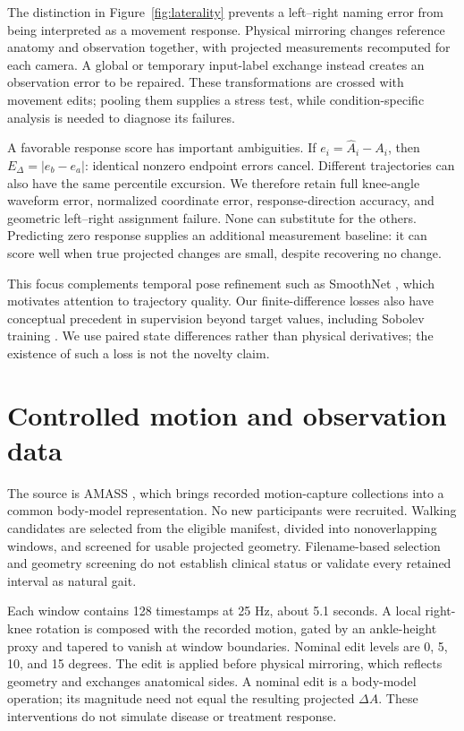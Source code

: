 \documentclass{article}
\begin{document}
The distinction in Figure~\ref{fig:laterality} prevents a left--right naming error from being interpreted as a movement response. Physical mirroring changes reference anatomy and observation together, with projected measurements recomputed for each camera. A global or temporary input-label exchange instead creates an observation error to be repaired. These transformations are crossed with movement edits; pooling them supplies a stress test, while condition-specific analysis is needed to diagnose its failures.

A favorable response score has important ambiguities. If $e_i=\widehat A_i-A_i$, then $E_\Delta=|e_b-e_a|$: identical nonzero endpoint errors cancel. Different trajectories can also have the same percentile excursion. We therefore retain full knee-angle waveform error, normalized coordinate error, response-direction accuracy, and geometric left--right assignment failure. None can substitute for the others. Predicting zero response supplies an additional measurement baseline: it can score well when true projected changes are small, despite recovering no change.

This focus complements temporal pose refinement such as SmoothNet \citep{zeng2022smoothnet}, which motivates attention to trajectory quality. Our finite-difference losses also have conceptual precedent in supervision beyond target values, including Sobolev training \citep{czarnecki2017sobolev}. We use paired state differences rather than physical derivatives; the existence of such a loss is not the novelty claim.

\clearpage
\section{Controlled motion and observation data}
The source is AMASS \citep{mahmood2019amass}, which brings recorded motion-capture collections into a common body-model representation. No new participants were recruited. Walking candidates are selected from the eligible manifest, divided into nonoverlapping windows, and screened for usable projected geometry. Filename-based selection and geometry screening do not establish clinical status or validate every retained interval as natural gait.

Each window contains 128 timestamps at 25 Hz, about 5.1 seconds. A local right-knee rotation is composed with the recorded motion, gated by an ankle-height proxy and tapered to vanish at window boundaries. Nominal edit levels are 0, 5, 10, and 15 degrees. The edit is applied before physical mirroring, which reflects geometry and exchanges anatomical sides. A nominal edit is a body-model operation; its magnitude need not equal the resulting projected $\Delta A$. These interventions do not simulate disease or treatment response.
\end{document}
